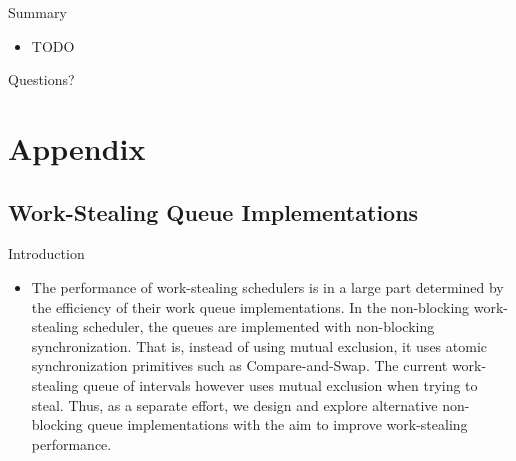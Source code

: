 \begin{frame}{Summary}
  \begin{itemize}
  \item TODO
  \end{itemize}
\end{frame}

\note{
}

\begin{frame}
  \begin{center}
    \huge Questions?
  \end{center}
\end{frame}

\note{
}


\appendix

\section{Appendix}

\subsection{Work-Stealing Queue Implementations}

\begin{frame}{Introduction}
  \begin{itemize}
  \item The performance of work-stealing schedulers is in a large part
    determined by the efficiency of their work queue
    implementations. In the non-blocking work-stealing scheduler, the
    queues are implemented with non-blocking synchronization. That is,
    instead of using mutual exclusion, it uses atomic synchronization
    primitives such as Compare-and-Swap. The current work-stealing
    queue of intervals however uses mutual exclusion when trying to
    steal. Thus, as a separate effort, we design and explore
    alternative non-blocking queue implementations with the aim to
    improve work-stealing performance.
  \end{itemize}
\end{frame}


